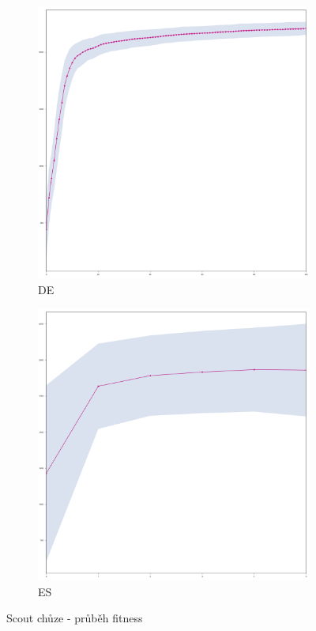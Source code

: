 	\begin{figure}[p]
		\centering
		\begin{subfigure}{.5\textwidth}
			\centering
			\includegraphics[width=\linewidth]{../img/WoodMap/DE/graph_of_CuttorWalk-mean.png}
			\caption{DE}
			\label{obr04:WalkDE}
		\end{subfigure}%
		\begin{subfigure}{.5\textwidth}
			\centering
			\includegraphics[width=\linewidth]{../img/WoodMap/ES/WoodWalkES-mean.png}
			\caption{ES}
			\label{obr04:WalkES}
		\end{subfigure}
		\caption{Scout chůze - průběh fitness }
		\label{obr04:Walk}
	\end{figure}
	\clearpage
	
